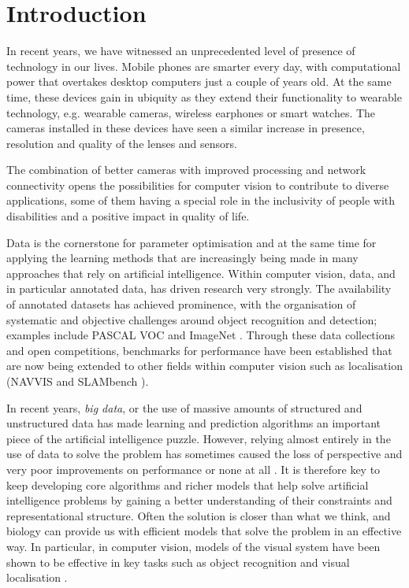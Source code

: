 \chapter{Introduction}\label{ch:introduction}

In recent years, we have witnessed an unprecedented level of presence of technology in our lives. Mobile phones are smarter every day, with computational power that overtakes desktop computers just a couple of years old. At the same time, these devices gain in ubiquity as they extend their functionality to wearable technology, e.g. wearable cameras, wireless earphones or smart watches. The cameras installed in these devices have seen a similar increase in presence, resolution and quality of the lenses and sensors.

The combination of better cameras with improved processing and network connectivity opens the possibilities for computer vision to contribute to diverse applications, some of them having a special role in the inclusivity of people with disabilities and a positive impact in quality of life.

Data is the cornerstone for parameter optimisation and at the same time for applying the learning methods that are increasingly being made in many approaches that rely on artificial intelligence. Within computer vision, data, and in particular annotated data, has driven research very strongly. The availability of annotated datasets has achieved prominence, with the organisation of systematic and objective challenges around object recognition and detection; examples include PASCAL VOC \cite{everingham2010pascal} and ImageNet \citep{Deng2009}. Through these data collections and open competitions, benchmarks for performance have been established that are now being extended to other fields within computer vision such as localisation (NAVVIS \cite{Huitl2012} and SLAMbench \cite{nardi2014introducing}).

In recent years, \textit{big data}, or the use of massive amounts of structured and unstructured data has made learning and prediction algorithms an important piece of the artificial intelligence puzzle. However, relying almost entirely in the use of data to solve the problem has sometimes caused the loss of perspective and very poor improvements on performance or none at all \cite{zhu2012we}. It is therefore key to keep developing core algorithms and richer models that help solve artificial intelligence problems by gaining a better understanding of their constraints and representational structure. Often the solution is closer than what we think, and biology can provide us with efficient models that solve the problem in an effective way. In particular, in computer vision, models of the visual system have been shown to be effective in key tasks such as object recognition and visual localisation \cite{lowe2004distinctive,milford2004ratslam}. 


